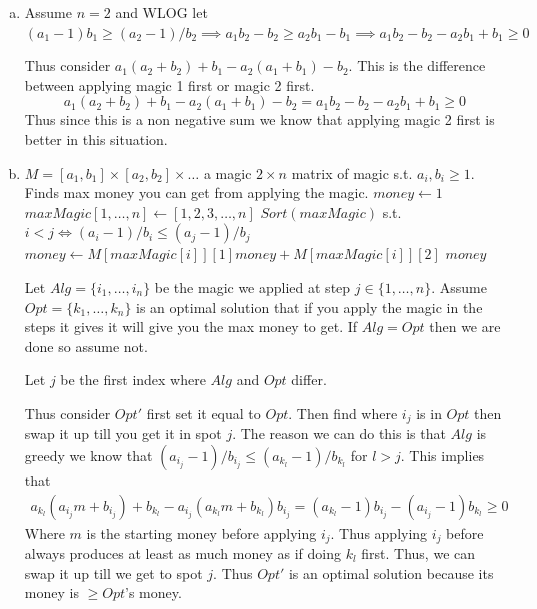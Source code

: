 \documentclass[12pt, letterpaper]{article}
\theoremstyle{definition}
\begin{document}
\begin{enumerate}[(a)]
    \item Assume $n=2$ and WLOG let $(a_1-1)b_1 \geq (a_2 -1)/b_2 \implies a_1b_2-b_2  \geq a_2b_1-b_1 \implies a_1b_2-b_2 - a_2b_1 + b_1 \geq 0$
    
    Thus consider $a_1(a_2+b_2)+b_1-a_2(a_1+b_1)-b_2$. This is the difference between applying magic 1 first or magic 2 first.
    \[a_1(a_2+b_2)+b_1-a_2(a_1+b_1)-b_2=a_1b_2-b_2-a_2b_1+b_1 \geq 0\]
    Thus since this is a non negative sum we know that applying magic 2 first is better in this situation.

    \item \begin{algorithm}[H]
        \caption{MaxMoney}
        \begin{algorithmic}[1]
        \Require $M=[a_1,b_1] \times [a_2,b_2] \times \dots$ a magic $2 \times n$ matrix of magic s.t. $a_i,b_i \geq 1$. 
        \Ensure Finds max money you can get from applying the magic.
                \State {}
            \EndIf
            \State $money \gets 1$
            \State $maxMagic[1,\dots,n] \gets [1,2,3,\dots,n]$ 
            \State $Sort(maxMagic)$ s.t. $i < j \iff (a_i-1)/b_i \leq (a_j-1)/b_j$ 
                \State $money \gets M[maxMagic[i]][1]money + M[maxMagic[i]][2]$
            \EndFor
            \State \Return $money$
        \EndFunction
        \end{algorithmic}
        \end{algorithm}

        Let $Alg=\{i_1,\dots,i_n\}$ be the magic we applied at step $j \in \{1,\dots,n\}$. Assume $Opt=\{k_1,\dots,k_n\}$ is an optimal solution that if you apply the magic in the steps it gives it will give you the max money to get. If $Alg=Opt$ then we are done so assume not.

        Let $j$ be the first index where $Alg$ and $Opt$ differ.

        Thus consider $Opt'$ first set it equal to $Opt$. Then find where $i_j$ is in $Opt$ then swap it up till you get it in spot $j$. The reason we can do this is that $Alg$ is greedy we know that $(a_{i_j}-1)/b_{i_j} \leq (a_{k_l}-1)/b_{k_l}$ for $l > j$. This implies that
        \begin{align*}
            a_{k_l}(a_{i_j}m+b_{i_j})+b_{k_l}-a_{i_j}(a_{k_l}m+b_{k_l})b_{i_j}=(a_{k_l}-1)b_{i_j}-(a_{i_j}-1)b_{k_l} \geq 0
        \end{align*}
        Where $m$ is the starting money before applying $i_j$. Thus applying $i_j$ before always produces at least as much money as if doing $k_l$ first. Thus, we can swap it up till we get to spot $j$. Thus $Opt'$ is an optimal solution because its money is $\geq Opt$'s money.\


\end{enumerate}
\end{document}
